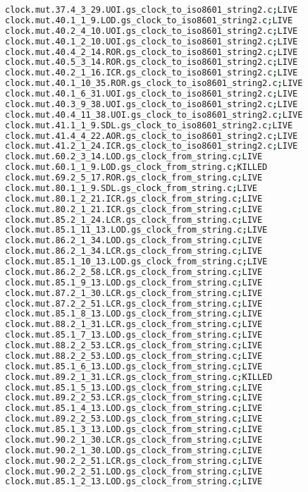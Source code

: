 \begin{lstlisting}[language=bash, label=statuses, caption=Mutants statuses.]
clock.mut.37.4_3_29.UOI.gs_clock_to_iso8601_string2.c;LIVE
clock.mut.40.1_1_9.LOD.gs_clock_to_iso8601_string2.c;LIVE
clock.mut.40.2_4_10.UOI.gs_clock_to_iso8601_string2.c;LIVE
clock.mut.40.1_2_10.UOI.gs_clock_to_iso8601_string2.c;LIVE
clock.mut.40.4_2_14.ROR.gs_clock_to_iso8601_string2.c;LIVE
clock.mut.40.5_3_14.ROR.gs_clock_to_iso8601_string2.c;LIVE
clock.mut.40.2_1_16.ICR.gs_clock_to_iso8601_string2.c;LIVE
clock.mut.40.1_10_35.ROR.gs_clock_to_iso8601_string2.c;LIVE
clock.mut.40.1_6_31.UOI.gs_clock_to_iso8601_string2.c;LIVE
clock.mut.40.3_9_38.UOI.gs_clock_to_iso8601_string2.c;LIVE
clock.mut.40.4_11_38.UOI.gs_clock_to_iso8601_string2.c;LIVE
clock.mut.41.1_1_9.SDL.gs_clock_to_iso8601_string2.c;LIVE
clock.mut.41.4_4_22.AOR.gs_clock_to_iso8601_string2.c;LIVE
clock.mut.41.2_1_24.ICR.gs_clock_to_iso8601_string2.c;LIVE
clock.mut.60.2_3_14.LOD.gs_clock_from_string.c;LIVE
clock.mut.60.1_1_9.LOD.gs_clock_from_string.c;KILLED
clock.mut.69.2_5_17.ROR.gs_clock_from_string.c;LIVE
clock.mut.80.1_1_9.SDL.gs_clock_from_string.c;LIVE
clock.mut.80.1_2_21.ICR.gs_clock_from_string.c;LIVE
clock.mut.80.2_1_21.ICR.gs_clock_from_string.c;LIVE
clock.mut.85.2_1_24.LCR.gs_clock_from_string.c;LIVE
clock.mut.85.1_11_13.LOD.gs_clock_from_string.c;LIVE
clock.mut.86.2_1_34.LOD.gs_clock_from_string.c;LIVE
clock.mut.86.2_1_34.LCR.gs_clock_from_string.c;LIVE
clock.mut.85.1_10_13.LOD.gs_clock_from_string.c;LIVE
clock.mut.86.2_2_58.LCR.gs_clock_from_string.c;LIVE
clock.mut.85.1_9_13.LOD.gs_clock_from_string.c;LIVE
clock.mut.87.2_1_30.LCR.gs_clock_from_string.c;LIVE
clock.mut.87.2_2_51.LCR.gs_clock_from_string.c;LIVE
clock.mut.85.1_8_13.LOD.gs_clock_from_string.c;LIVE
clock.mut.88.2_1_31.LCR.gs_clock_from_string.c;LIVE
clock.mut.85.1_7_13.LOD.gs_clock_from_string.c;LIVE
clock.mut.88.2_2_53.LCR.gs_clock_from_string.c;LIVE
clock.mut.88.2_2_53.LOD.gs_clock_from_string.c;LIVE
clock.mut.85.1_6_13.LOD.gs_clock_from_string.c;LIVE
clock.mut.89.2_1_31.LCR.gs_clock_from_string.c;KILLED
clock.mut.85.1_5_13.LOD.gs_clock_from_string.c;LIVE
clock.mut.89.2_2_53.LCR.gs_clock_from_string.c;LIVE
clock.mut.85.1_4_13.LOD.gs_clock_from_string.c;LIVE
clock.mut.89.2_2_53.LOD.gs_clock_from_string.c;LIVE
clock.mut.85.1_3_13.LOD.gs_clock_from_string.c;LIVE
clock.mut.90.2_1_30.LCR.gs_clock_from_string.c;LIVE
clock.mut.90.2_1_30.LOD.gs_clock_from_string.c;LIVE
clock.mut.90.2_2_51.LCR.gs_clock_from_string.c;LIVE
clock.mut.90.2_2_51.LOD.gs_clock_from_string.c;LIVE
clock.mut.85.1_2_13.LOD.gs_clock_from_string.c;LIVE

\end{lstlisting}
